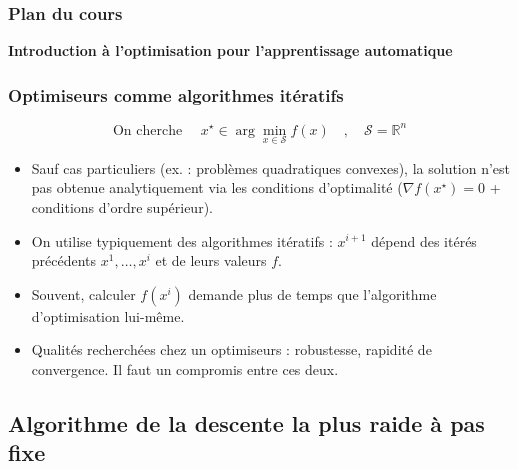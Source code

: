 \documentclass[12pt]{beamer}
\begin{document}
\begin{frame}
\begin{itemize}
\begin{frame}%
\frametitle{Plan du cours} 
\begin{multicols}{2}
\begin{center} \textbf{Introduction à l’optimisation pour l’apprentissage automatique} \end{center}
\tableofcontents[currentsection]
\end{multicols}
\end{frame}


\begin{frame}
\frametitle{Optimiseurs comme algorithmes itératifs} 
\begin{equation*}
\text{On cherche } \quad  x^\star \in \arg\min_{x \in \mathcal S} f(x) \quad,\quad \mathcal S = \mathbb{R}^n
\end{equation*}
\begin{itemize}
\item Sauf cas particuliers (ex. : problèmes quadratiques convexes), la solution n’est pas obtenue analytiquement via les conditions d’optimalité ($\nabla f(x^\star) = 0$ + conditions d’ordre supérieur).
\item On utilise typiquement des algorithmes itératifs : $x^{i+1}$ dépend des itérés précédents $x^1, \ldots, x^i$ et de leurs valeurs $f$.
\item Souvent, calculer $f(x^i)$ demande plus de temps que l’algorithme d’optimisation lui-même.
\item Qualités recherchées chez un optimiseurs : robustesse, rapidité de convergence. Il faut un compromis entre ces deux.
\end{itemize}
\end{frame}

\subsection{Algorithme de la descente la plus raide à pas fixe}


\end{itemize}
\end{frame}
\end{document}
